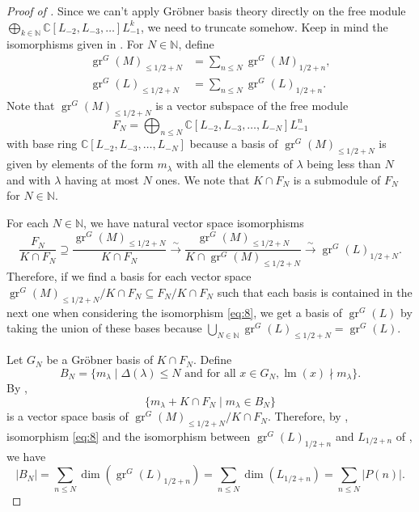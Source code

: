 \documentclass[12pt, reqno]{amsart}
\theoremstyle{remark}
\DeclareMathOperator{\gr}{gr}
\DeclareMathOperator{\lm}{lm}
\begin{document}
\begin{proof}[Proof of ]
  Since we can't apply Gr\"{o}bner basis theory directly on the free module $\bigoplus_{k \in \mathbb{N}}\mathbb{C}[L_{-2}, L_{-3}, \dots]L_{-1}^k$, we need to truncate somehow.
  Keep in mind the isomorphisms given in .
  For $N \in \mathbb{N}$, define
  \begin{align*}
    \gr^G(M)_{\le 1/2 + N} &= \sum_{n \le N}\gr^G(M)_{1/2 + n}, \\
    \gr^G(L)_{\le 1/2 + N} &= \sum_{n \le N}\gr^G(L)_{1/2 + n}.
  \end{align*}
  Note that $\gr^G(M)_{\le 1/2 + N}$ is a vector subspace of the free module
  \begin{equation*}
    F_N = \bigoplus_{n \le N}\mathbb{C}[L_{-2}, L_{-3}, \dots, L_{-N}]L_{-1}^n
  \end{equation*}
  with base ring $\mathbb{C}[L_{-2}, L_{-3}, \dots, L_{-N}]$ because a basis of $\gr^G(M)_{\le 1/2 + N}$ is given by elements of the form $m_\lambda$ with all the elements of $\lambda$ being less than $N$ and with $\lambda$ having at most $N$ ones.
  We note that $K \cap F_N$ is a submodule of $F_N$ for $N \in \mathbb{N}$.
  
  For each $N \in \mathbb{N}$, we have natural vector space isomorphisms
  \begin{equation}
    \label{eq:8}
    \frac{F_N}{K \cap F_N} \supseteq \frac{\gr^G(M)_{\le 1/2 + N}}{K \cap F_N} \xrightarrow{\sim} \frac{\gr^G(M)_{\le 1/2 + N}}{K \cap \gr^G(M)_{\le 1/2 + N}} \xrightarrow{\sim} \gr^G(L)_{1/2 + N}.
  \end{equation}
  Therefore, if we find a basis for each vector space $\gr^G(M)_{\le 1/2 + N}/K \cap F_N \subseteq F_N/K \cap F_N$ such that each basis is contained in the next one when considering the isomorphism \eqref{eq:8}, we get a basis of $\gr^G(L)$ by taking the union of these bases because $\bigcup_{N \in \mathbb{N}}\gr^G(L)_{\le 1/2 + N} = \gr^G(L)$.
  
  Let $G_N$ be a Gr\"{o}bner basis of $K \cap F_N$.
  Define
  \begin{equation*}
    B_N = \{m_\lambda \mid \Delta(\lambda) \le N\text{ and for all }x \in G_N, \lm(x) \nmid m_\lambda\}.
  \end{equation*}
  By \cite[Proposition 3.6.4]{adams_introduction_1994},
  \begin{equation}
    \label{eq:9}
    \{m_\lambda + K \cap F_N \mid m_\lambda \in B_N\}
  \end{equation}
  is a vector space basis of $\gr^G(M)_{\le 1/2 + N}/K \cap F_N$.
  Therefore, by , isomorphism \eqref{eq:8} and the isomorphism between $\gr^G(L)_{1/2 + n}$ and $L_{1/2 + n}$ of , we have
  \begin{equation*}
    |B_N| = \sum_{n \le N}\dim(\gr^G(L)_{1/2 + n}) = \sum_{n \le N}\dim(L_{1/2 + n}) = \sum_{n \le N}|P(n)|.
  \end{equation*}
  

\end{proof}
\end{document}
